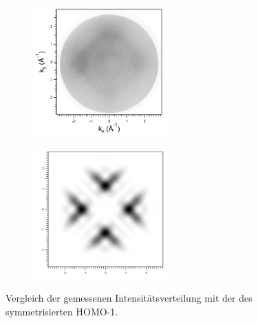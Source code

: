                 \begin{figure}
                    \centering
                    \begin{subfigure}[t]{0.48\textwidth}
                        \centering
                        \includegraphics[height=5cm]{./content/pictures/FeO+5A/FeO_5A_32_15eV.png}
                    \end{subfigure}
                    \begin{subfigure}[t]{0.48\textwidth}
                        \centering
                        \includegraphics[height=5cm]{./content/pictures/FeO+5A/MO_HOMO1_RT_RT.png}
                    \end{subfigure}
                    \caption{Vergleich der gemessenen Intensitätsverteilung mit der des symmetrisierten HOMO-1.}
                    \label{fig:FeO5A3}
                \end{figure}
